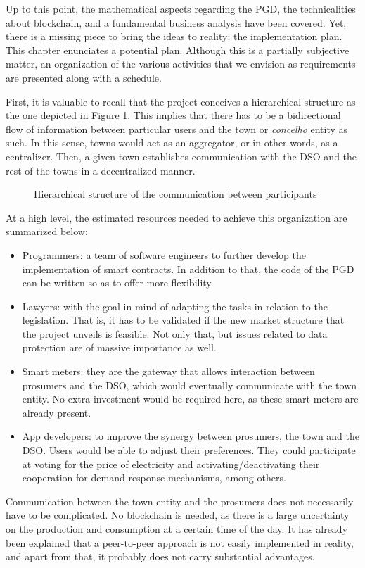 Up to this point, the mathematical aspects regarding the PGD, the technicalities about blockchain, and a fundamental business analysis have been covered. Yet, there is a missing piece to bring the ideas to reality: the implementation plan. This chapter enunciates a potential plan. Although this is a partially subjective matter, an organization of the various activities that we envision as requirements are presented along with a schedule. 

First, it is valuable to recall that the project conceives a hierarchical structure as the one depicted in Figure \ref{fig:plan1}. This implies that there has to be a bidirectional flow of information between particular users and the town or \textit{concelho} entity as such. In this sense, towns would act as an aggregator, or in other words, as a centralizer.  Then, a given town establishes communication with the DSO and the rest of the towns in a decentralized manner.

\begin{figure}[!htb]\centering
    \caption{Hierarchical structure of the communication between participants}
    \label{fig:plan1}
\end{figure}

At a high level, the estimated resources needed to achieve this organization are summarized below:
\begin{itemize}
	\item Programmers: a team of software engineers to further develop the implementation of smart contracts. In addition to that, the code of the PGD can be written so as to offer more flexibility. 
	\item Lawyers: with the goal in mind of adapting the tasks in relation to the legislation. That is, it has to be validated if the new market structure that the project unveils is feasible. Not only that, but issues related to data protection are of massive importance as well. 
	\item Smart meters: they are the gateway that allows interaction between prosumers and the DSO, which would eventually communicate with the town entity. No extra investment would be required here, as these smart meters are already present. 
	\item App developers: to improve the synergy between prosumers, the town and the DSO. Users would be able to adjust their preferences. They could participate at voting for the price of electricity and activating/deactivating their cooperation for demand-response mechanisms, among others. 
\end{itemize}
Communication between the town entity and the prosumers does not necessarily have to be complicated. No blockchain is needed, as there is a large uncertainty on the production and consumption at a certain time of the day. It has already been explained that a peer-to-peer approach is not easily implemented in reality, and apart from that, it probably does not carry substantial advantages. 



